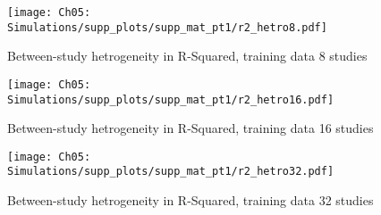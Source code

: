 \begin{figure}[H]
  \centering
  \texttt{[image: Ch05: Simulations/supp\_plots/supp\_mat\_pt1/r2\_hetro8.pdf]}
  \caption{Between-study hetrogeneity in R-Squared, training data 8 studies}
\end{figure}

\begin{figure}[H]
  \centering
  \texttt{[image: Ch05: Simulations/supp\_plots/supp\_mat\_pt1/r2\_hetro16.pdf]}
  \caption{Between-study hetrogeneity in R-Squared, training data 16 studies}
\end{figure}

\begin{figure}[H]
  \centering
  \texttt{[image: Ch05: Simulations/supp\_plots/supp\_mat\_pt1/r2\_hetro32.pdf]}
  \caption{Between-study hetrogeneity in R-Squared, training data 32 studies}
\end{figure}

